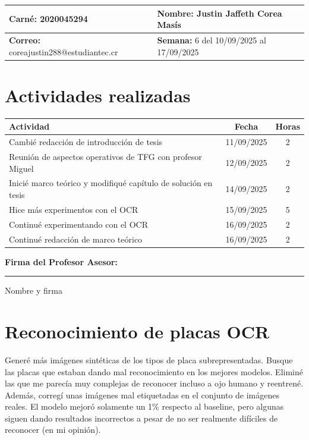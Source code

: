 \documentclass[12pt,a4paper]{article}
\begin{document}
\noindent
\begin{tabularx}{\textwidth}{|X|X|}
\hline
\textbf{Carné:} 2020045294 & \textbf{Nombre:} Justin Jaffeth Corea Masís \\
\hline
\textbf{Correo:} coreajustin288@estudiantec.cr & \textbf{Semana:} 6 del 10/09/2025 al 17/09/2025 \\
\hline
\end{tabularx}

\vspace{0.5cm}

\section*{Actividades realizadas}

\begin{tabularx}{\textwidth}{|>{\raggedright\arraybackslash}p{12cm}|c|c|}
\hline
\textbf{Actividad} & \textbf{Fecha} & \textbf{Horas} \\
\hline
	Cambié redacción de introducción de tesis & 11/09/2025 & 2 \\
\hline
	Reunión de aspectos operativos de TFG con profesor Miguel & 12/09/2025 & 2 \\
\hline
	Inicié marco teórico y modifiqué capítulo de solución en tesis & 14/09/2025 & 2 \\
\hline
	Hice más experimentos con el OCR & 15/09/2025 & 5 \\
\hline
	Continué experimentando con el OCR & 16/09/2025 & 2 \\
\hline
	Continué redacción de marco teórico & 16/09/2025 & 2 \\
\hline
\end{tabularx}

\vspace{1cm}

\noindent
\textbf{Firma del Profesor Asesor:}

\vspace{2cm}

\noindent\rule{8cm}{0.4pt}  
Nombre y firma

\newpage

\section{Reconocimiento de placas OCR}
Generé más imágenes sintéticas de los tipos de placa subrepresentadas.
Busque las placas que estaban dando mal reconocimiento en los mejores modelos.
Eliminé las que me parecía muy complejas de reconocer incluso a ojo humano y 
reentrené. Además, corregí unas imágenes mal etiquetadas
en el conjunto de imágenes reales.
El modelo mejoró solamente un 1\% respecto al baseline,
pero algunas siguen dando resultados incorrectos a pesar de
no ser realmente difíciles de reconocer (en mi opinión).
\end{document}
